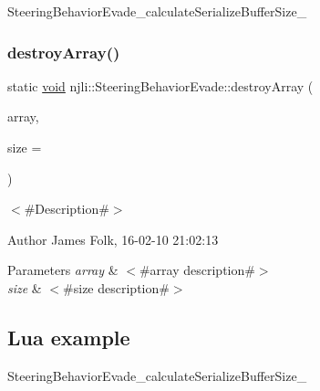\begin{DoxyCodeInclude}
\end{DoxyCodeInclude}
Steering\+Behavior\+Evade\+\_\+calculate\+Serialize\+Buffer\+Size\+\_\+ \mbox{\label{classnjli_1_1_steering_behavior_evade_af4226a065b9afeda6de43e7642b953bb}} 
\subsubsection{\texorpdfstring{destroy\+Array()}{destroyArray()}}
{\footnotesize\ttfamily static \mbox{\hyperlink{_thread_8h_af1e856da2e658414cb2456cb6f7ebc66}{void}} njli\+::\+Steering\+Behavior\+Evade\+::destroy\+Array (\begin{DoxyParamCaption}\item[{\mbox{\hyperlink{classnjli_1_1_steering_behavior_evade}{Steering\+Behavior\+Evade}} $\ast$$\ast$}]{array,  }\item[{const \mbox{\hyperlink{_util_8h_a10e94b422ef0c20dcdec20d31a1f5049}{u32}}}]{size = {} }\end{DoxyParamCaption})\hspace{0.3cm}{\ttfamily [static]}}



$<$\#\+Description\#$>$ 

\begin{DoxyAuthor}{Author}
James Folk, 16-\/02-\/10 21\+:02\+:13
\end{DoxyAuthor}

\begin{DoxyParams}{Parameters}
{\em array} & $<$\#array description\#$>$ \\
\hline
{\em size} & $<$\#size description\#$>$\\
\hline
\end{DoxyParams}
\hypertarget{classnjli_1_1_steering_behavior_wander_ex1}{}\subsection{Lua example}\label{classnjli_1_1_steering_behavior_wander_ex1}

\begin{DoxyCodeInclude}
\end{DoxyCodeInclude}
Steering\+Behavior\+Evade\+\_\+calculate\+Serialize\+Buffer\+Size\+\_\+ \mbox{\label{classnjli_1_1_steering_behavior_evade_a764995d627d1735471951041885bb3dc}} 

